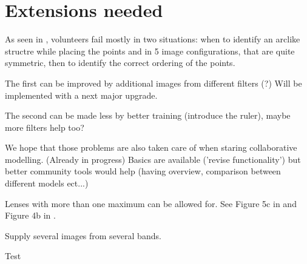 \section{Extensions needed} \label{sec:todo}

As seen in , volunteers fail mostly in two situations:
when to identify an arclike structre while placing the points
and in 5 image configurations, that are quite symmetric, then to identify the correct ordering of the points.

The first can be improved by additional images from different filters (?)
Will be implemented with a next major \spl upgrade.

The second can be made less by better training (introduce the ruler), maybe more filters help too?

We hope that those problems are also taken care of when staring collaborative modelling. (Already in progress)
Basics are available ('revise functionality') but better community tools would help (having overview, comparison between different models ect...)

Lenses with more than one maximum can be allowed for.  See Figure 5c
in \citep{2001ApJ...557..594R} and Figure 4b in
\cite{2003ApJ...590...39K}.

Supply several images from several bands.

Test
